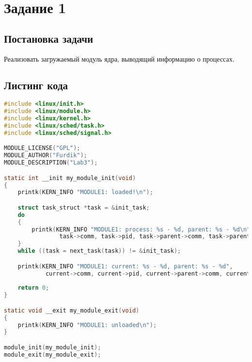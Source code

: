 \newpage
\section*{Задание 1}
\subsection*{Постановка задачи}
Реализовать загружаемый модуль ядра, выводящий информацию о процессах.


\subsection*{Листинг кода}

\begin{lstlisting}[language=c,caption=Листинг кода загружаемого модуль ядра для задания 1]
#include <linux/init.h>
#include <linux/module.h>
#include <linux/kernel.h>
#include <linux/sched/task.h>
#include <linux/sched/signal.h>

MODULE_LICENSE("GPL");
MODULE_AUTHOR("Furdik");
MODULE_DESCRIPTION("Lab3");

static int __init my_module_init(void)
{
	printk(KERN_INFO "MODULE1: loaded!\n");

	struct task_struct *task = &init_task;
	do
	{
		printk(KERN_INFO "MODULE1: process: %s - %d, parent: %s - %d\n",
				task->comm, task->pid, task->parent->comm, task->parent->pid);
	}
	while ((task = next_task(task)) != &init_task);

	printk(KERN_INFO "MODULE1: current: %s - %d, parent: %s - %d",
			current->comm, current->pid, current->parent->comm, current->parent->pid);
		
	return 0;
}

static void __exit my_module_exit(void)
{
	printk(KERN_INFO "MODULE1: unloaded\n");
}

module_init(my_module_init);
module_exit(my_module_exit);
\end{lstlisting}
\newpage
